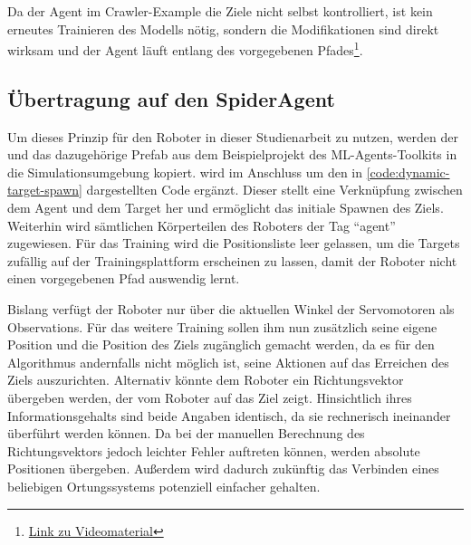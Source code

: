 Da der Agent im Crawler-Example die Ziele nicht selbst kontrolliert, ist kein erneutes Trainieren des Modells nötig, sondern die Modifikationen sind direkt wirksam und der Agent läuft entlang des vorgegebenen Pfades\footnote{\href{https://github.com/yschiebelhut/studienarbeit-doc/raw/master/Videos/crawler-poc.webm}{Link zu Videomaterial}}.

\subsection{Übertragung auf den SpiderAgent}
Um dieses Prinzip für den Roboter in dieser Studienarbeit zu nutzen, werden der  und das dazugehörige Prefab aus dem Beispielprojekt des ML-Agents-Toolkits in die Simulationsumgebung kopiert.
 wird im Anschluss um den in \autoref{code:dynamic-target-spawn} dargestellten Code ergänzt.
Dieser stellt eine Verknüpfung zwischen dem Agent und dem Target her und ermöglicht das initiale Spawnen des Ziels.
Weiterhin wird sämtlichen Körperteilen des Roboters der Tag \enquote{agent} zugewiesen.
Für das Training wird die Positionsliste leer gelassen, um die Targets zufällig auf der Trainingsplattform erscheinen zu lassen, damit der Roboter nicht einen vorgegebenen Pfad auswendig lernt.


\begin{figure}
    
\end{figure}

Bislang verfügt der Roboter nur über die aktuellen Winkel der Servomotoren als Observations.
Für das weitere Training sollen ihm nun zusätzlich seine eigene Position und die Position des Ziels zugänglich gemacht werden, da es für den Algorithmus andernfalls nicht möglich ist, seine Aktionen auf das Erreichen des Ziels auszurichten.
Alternativ könnte dem Roboter ein Richtungsvektor übergeben werden, der vom Roboter auf das Ziel zeigt.
Hinsichtlich ihres Informationsgehalts sind beide Angaben identisch, da sie rechnerisch ineinander überführt werden können.
Da bei der manuellen Berechnung des Richtungsvektors jedoch leichter Fehler auftreten können, werden absolute Positionen übergeben.
Außerdem wird dadurch zukünftig das Verbinden eines beliebigen Ortungssystems potenziell einfacher gehalten.

